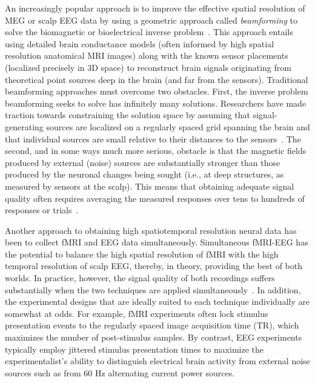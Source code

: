 \documentclass[11pt]{article}
\begin{document}
An increasingly popular approach is to improve the effective spatial
resolution of MEG or scalp EEG data by using a geometric approach
called \textit{beamforming} to solve the biomagnetic or bioelectrical
inverse problem~\citep{Sarv87}.  This approach entails using detailed
brain conductance models (often informed by high spatial resolution
anatomical MRI images) along with the known sensor placements
(localized precisely in 3D space) to reconstruct brain signals
originating from theoretical point sources deep in the brain (and far
from the sensors).  Traditional beamforming approaches must overcome
two obstacles.  First, the inverse problem beamforming seeks to solve
has infinitely many solutions.  Researchers have made traction towards
constraining the solution space by assuming that signal-generating
sources are localized on a regularly spaced grid spanning the brain
and that individual sources are small relative to their distances to
the sensors~\citep{Snyd91, BailEtal01, HillEtal05}.  The second, and in
some ways much more serious, obstacle is that the magnetic fields
produced by external (noise) sources are substantially stronger than
those produced by the neuronal changes being sought (i.e., at deep
structures, as measured by sensors at the scalp).  This means that
obtaining adequate signal quality often requires averaging the
measured responses over tens to hundreds of responses or trials~\citep[e.g., see review by][]{HillEtal05}.

Another approach to obtaining high spatiotemporal resolution
neural data has been to collect fMRI and EEG data simultaneously.
Simultaneous fMRI-EEG has the potential to balance the high spatial
resolution of fMRI with the high temporal resolution of scalp EEG,
thereby, in theory, providing the best of both worlds.  In practice,
however, the signal quality of both recordings suffers substantially
when the two techniques are applied simultaneously~\citep[e.g., see review by][]{HustEtal12}.  In addition, the experimental designs that are
ideally suited to each technique individually are somewhat at odds.
For example, fMRI experiments often lock stimulus presentation
events to the regularly spaced image acquisition time (TR), which
maximizes the number of post-stimulus samples.  By contrast, EEG
experiments typically employ jittered stimulus presentation times to
maximize the experimentalist's ability to distinguish electrical brain
activity from external noise sources such as from 60 Hz alternating
current power sources.
\end{document}
